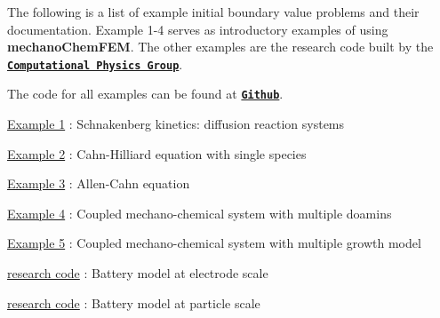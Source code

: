 The following is a list of example initial boundary value problems and their documentation. Example 1-\/4 serves as introductory examples of using {\bfseries mechano\-Chem\-F\-E\-M}. The other examples are the research code built by the \href{http://umich.edu/~compphys/index.html}{\tt {\bfseries Computational Physics Group}}.

The code for all examples can be found at \href{https://github.com/mechanoChem/mechanoChemFEM/tree/example}{\tt {\bfseries Github}}.

\hyperlink{diffusion_reaction}{Example 1} \-: Schnakenberg kinetics\-: diffusion reaction systems \par
 \hyperlink{_cahn_hilliard}{Example 2} \-: Cahn-\/\-Hilliard equation with single species\par
 \hyperlink{_allen__cahn}{Example 3} \-: Allen-\/\-Cahn equation \par
 \hyperlink{growth}{Example 4} \-: Coupled mechano-\/chemical system with multiple doamins\par
 \hyperlink{brain_morph}{Example 5} \-: Coupled mechano-\/chemical system with multiple growth model\par




\hyperlink{battery_electrode_scale}{research code} \-: Battery model at electrode scale\par
 \hyperlink{battery_particle}{research code} \-: Battery model at particle scale\par

